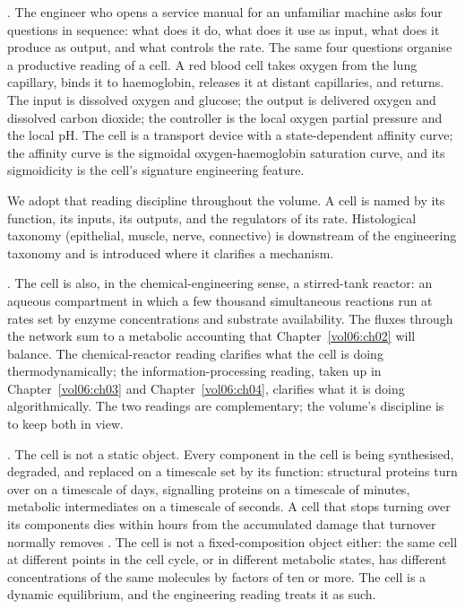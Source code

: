 . The engineer who
opens a service manual for an unfamiliar machine asks four questions
in sequence: what does it do, what does it use as input, what does it
produce as output, and what controls the rate. The same four questions
organise a productive reading of a cell. A red blood cell takes oxygen
from the lung capillary, binds it to haemoglobin, releases it at
distant capillaries, and returns. The input is dissolved oxygen and
glucose; the output is delivered oxygen and dissolved carbon dioxide;
the controller is the local oxygen partial pressure and the local pH.
The cell is a transport device with a state-dependent affinity curve;
the affinity curve is the sigmoidal oxygen-haemoglobin saturation
curve, and its sigmoidicity is the cell's signature engineering feature.

We adopt that reading discipline throughout the volume. A cell is
named by its function, its inputs, its outputs, and the regulators of
its rate. Histological taxonomy (epithelial, muscle, nerve, connective)
is downstream of the engineering taxonomy and is introduced where it
clarifies a mechanism.

. The cell is also, in the
chemical-engineering sense, a stirred-tank reactor: an aqueous
compartment in which a few thousand simultaneous reactions run at
rates set by enzyme concentrations and substrate availability. The
fluxes through the network sum to a metabolic accounting that
Chapter~\ref{vol06:ch02} will balance. The chemical-reactor reading
clarifies what the cell is doing thermodynamically; the
information-processing reading, taken up in Chapter~\ref{vol06:ch03}
and Chapter~\ref{vol06:ch04}, clarifies what it is doing
algorithmically. The two readings are complementary; the volume's
discipline is to keep both in view.

. The cell is not a static object. Every
component in the cell is being synthesised, degraded, and replaced on
a timescale set by its function: structural proteins turn over on a
timescale of days, signalling proteins on a timescale of minutes,
metabolic intermediates on a timescale of seconds. A cell that stops
turning over its components dies within hours from the accumulated
damage that turnover normally removes
\cite[ch.~6]{text:v6c01-alberts-mbc-2022}. The cell is not a
fixed-composition object either: the same cell at different points in
the cell cycle, or in different metabolic states, has different
concentrations of the same molecules by factors of ten or more. The
cell is a dynamic equilibrium, and the engineering reading treats it
as such.

